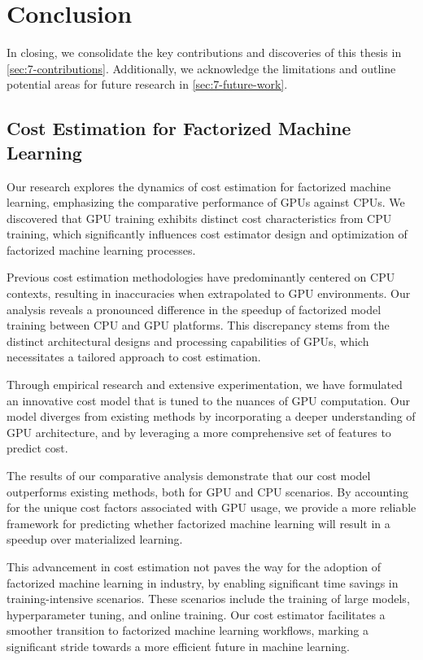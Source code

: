 
\chapter{Conclusion}

\label{chapter:conclusion}
In closing, we consolidate the key contributions and discoveries of this thesis in \autoref{sec:7-contributions}. Additionally, we acknowledge the limitations and outline potential areas for future research in \autoref{sec:7-future-work}.

\section{Cost Estimation for Factorized Machine Learning}
\label{sec:7-contributions}
Our research explores the dynamics of cost estimation for factorized machine learning, emphasizing the comparative performance of GPUs against CPUs. We discovered that GPU training exhibits distinct cost characteristics from CPU training, which significantly influences cost estimator design and optimization of factorized machine learning processes.

Previous cost estimation methodologies have predominantly centered on CPU contexts, resulting in inaccuracies when extrapolated to GPU environments. Our analysis reveals a pronounced difference in the speedup of factorized model training between CPU and GPU platforms. This discrepancy stems from the distinct architectural designs and processing capabilities of GPUs, which necessitates a tailored approach to cost estimation.

Through empirical research and extensive experimentation, we have formulated an innovative cost model that is tuned to the nuances of GPU computation. Our model diverges from existing methods by incorporating a deeper understanding of GPU architecture, and by leveraging a more comprehensive set of features to predict cost.

The results of our comparative analysis demonstrate that our cost model outperforms existing methods, both for GPU and CPU scenarios. By accounting for the unique cost factors associated with GPU usage, we provide a more reliable framework for predicting whether factorized machine learning will result in a speedup over materialized learning.

This advancement in cost estimation not paves the way for the adoption of factorized machine learning in industry, by enabling significant time savings in training-intensive scenarios. These scenarios include the training of large models, hyperparameter tuning, and online training. Our cost estimator facilitates a smoother transition to factorized machine learning workflows, marking a significant stride towards a more efficient future in machine learning.

